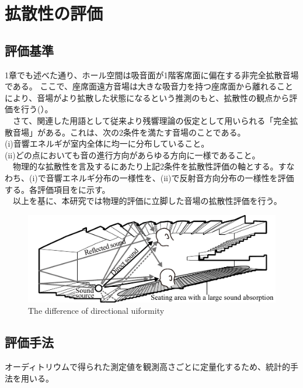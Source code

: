 \chapter{拡散性の評価}

\section{評価基準}
1章でも述べた通り、ホール空間は吸音面が1階客席面に偏在する非完全拡散音場である。
ここで、座席面遠方音場は大きな吸音力を持つ座席面から離れることにより、音場がより拡散した状態になるという推測のもと、拡散性の観点から評価を行う(）。
\\　さて、関連した用語として従来より残響理論の仮定として用いられる「完全拡散音場」がある。これは、次の2条件を満たす音場のことである。
\\(i)音響エネルギが室内全体に均一に分布していること。
\\(i\hspace{-.05em}i)どの点においても音の進行方向があらゆる方向に一様であること。
\\　物理的な拡散性を言及するにあたり上記2条件を拡散性評価の軸とする。すなわち、(i)で音響エネルギ分布の一様性を、(ii)で反射音方向分布の一様性を評価する。各評価項目をに示す。
\\　以上を基に、本研究では物理的評価に立脚した音場の拡散性評価を行う。
\vspace{0.8cm}
\begin{figure}[htbp]
    \centering
    \includegraphics[keepaspectratio,scale=1.7]{01_att/concert_ear.pdf}
    \caption{\hspace{1mm}The difference of directional uiformity}
    \label{fig:far_improve}
\end{figure}

\section{評価手法}
オーディトリウムで得られた測定値を観測高さごとに定量化するため、統計的手法を用いる。
